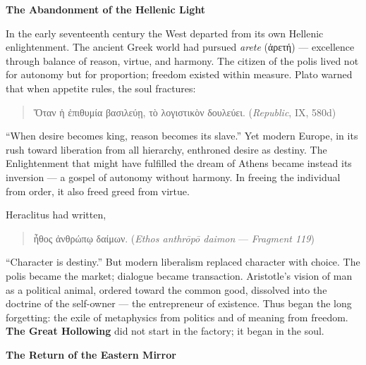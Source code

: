 \documentclass[11pt,twoside]{book}
\begin{document}
\bigskip

\textbf{The Abandonment of the Hellenic Light}

In the early seventeenth century the West departed from its own Hellenic enlightenment.  
The ancient Greek world had pursued \textit{arete} (ἀρετή) — excellence through balance of reason, virtue, and harmony.  
The citizen of the polis lived not for autonomy but for proportion; freedom existed within measure.  
Plato warned that when appetite rules, the soul fractures:  
\begin{quote}
\foreignlanguage{greek}{Ὅταν ἡ ἐπιθυμία βασιλεύῃ, τὸ λογιστικὸν δουλεύει.}  
(\textit{Republic}, IX, 580d)  
\end{quote}
“When desire becomes king, reason becomes its slave.”  
Yet modern Europe, in its rush toward liberation from all hierarchy, enthroned desire as destiny.  
The Enlightenment that might have fulfilled the dream of Athens became instead its inversion — a gospel of autonomy without harmony.  
In freeing the individual from order, it also freed greed from virtue.

Heraclitus had written,  
\begin{quote}
\foreignlanguage{greek}{ἦθος ἀνθρώπῳ δαίμων.}  
(\textit{Ethos anthrōpō daimon} — \textit{Fragment 119})  
\end{quote}
“Character is destiny.”  
But modern liberalism replaced character with choice.  
The polis became the market; dialogue became transaction.  
Aristotle’s vision of man as a political animal, ordered toward the common good, dissolved into the doctrine of the self-owner — the entrepreneur of existence.  
Thus began the long forgetting: the exile of metaphysics from politics and of meaning from freedom.  
\textbf{The Great Hollowing} did not start in the factory; it began in the soul.

\bigskip

\textbf{The Return of the Eastern Mirror}
\end{document}
